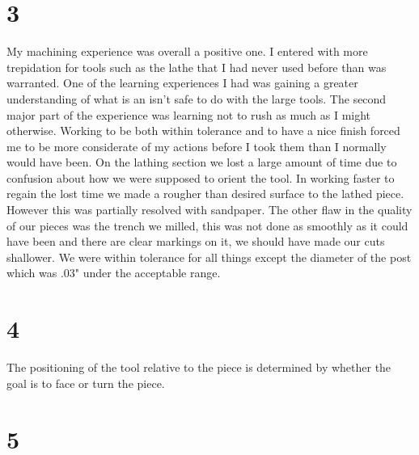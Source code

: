 \documentclass[11pt,letterpaper]{article}
\begin{document}
\section*{3} %
My machining experience was overall a positive one. I entered with more trepidation for tools such as the lathe that I had never used before than was warranted. One of the learning experiences I had was gaining a greater understanding of what is an isn't safe to do with the large tools. The second major part of the experience was learning not to rush as much as I might otherwise. Working to be both within tolerance and to have a nice finish forced me to be more considerate of my actions before I took them than I normally would have been. On the lathing section we lost a large amount of time due to confusion about how we were supposed to orient the tool. In working faster to regain the lost time we made a rougher than desired surface to the lathed piece. However this was partially resolved with sandpaper. The other flaw in the quality of our pieces was the trench we milled, this was not done as smoothly as it could have been and there are clear markings on it, we should have made our cuts shallower. We were within tolerance for all things except the diameter of the post which was .03" under the acceptable range.
\section*{4} %
The positioning of the tool relative to the piece is determined by whether the goal is to face or turn the piece. 
\section*{5} %
\end{document}
